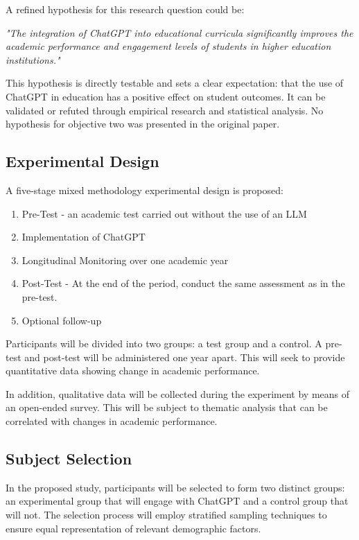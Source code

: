 \documentclass[12pt]{article}
\begin{document}
A refined hypothesis for this research question could be:

\textit{"The integration of ChatGPT into educational curricula significantly improves the academic performance and engagement levels of students in higher education institutions."}

This hypothesis is directly testable and sets a clear expectation: that the use of ChatGPT in education has a positive effect on student outcomes. It can be validated or refuted through empirical research and statistical analysis. No hypothesis for objective two was presented in the original paper.

\subsection{Experimental Design}

A five-stage mixed methodology experimental design is proposed:

\begin{enumerate}
    \item Pre-Test - an academic test carried out without the use of an LLM
    \item Implementation of ChatGPT
    \item Longitudinal Monitoring over one academic year
    \item Post-Test - At the end of the period, conduct the same assessment as in the pre-test.
    \item Optional follow-up
\end{enumerate}

Participants will be divided into two groups: a test group and a control. A pre-test and post-test will be administered one year apart. This will seek to provide quantitative data showing change in academic performance. 

In addition, qualitative data will be collected during the experiment by means of an open-ended survey. This will be subject to thematic analysis that can be correlated with changes in academic performance. 

\subsection{Subject Selection}

In the proposed study, participants will be selected to form two distinct groups: an experimental group that will engage with ChatGPT and a control group that will not. The selection process will employ stratified sampling techniques to ensure equal representation of relevant demographic factors. \cite{mertens}
\end{document}
